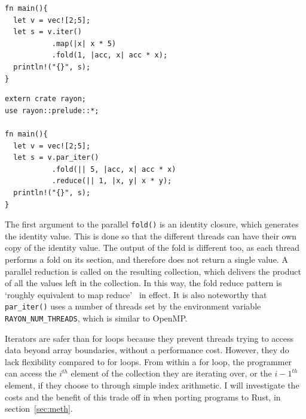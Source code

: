 \noindent\begin{minipage}{.49\textwidth}
\begin{code}
\begin{verbatim}
fn main(){
  let v = vec![2;5];
  let s = v.iter()
           .map(|x| x * 5)
           .fold(1, |acc, x| acc * x);
  println!("{}", s);
}
\end{verbatim}
\label{lst:rust-seq-iter}
\end{code}
\end{minipage}\hfill
\begin{minipage}{.49\textwidth}
\begin{code}
\begin{verbatim}
extern crate rayon;
use rayon::prelude::*;

fn main(){
  let v = vec![2;5];
  let s = v.par_iter()
           .fold(|| 5, |acc, x| acc * x)
           .reduce(|| 1, |x, y| x * y);
  println!("{}", s);
}
\end{verbatim}
\label{lst:rust-par-iter}
\label{lst:iters-a}
\end{code}
\end{minipage}

The first argument to the parallel \texttt{fold()} is an identity closure, which generates the identity value. This is done so that the different threads can have their own copy of the identity value. The output of the fold is different too, as each thread performs a fold on its section, and therefore does not return a single value. A parallel reduction is called on the resulting collection, which delivers the product of all the values left in the collection.
In this way, the fold reduce pattern is `roughly equivalent to map reduce'~\cite{rayonFold} in effect. It is also noteworthy that \texttt{par\_iter()} uses a number of threads set by the environment variable \texttt{RAYON\_NUM\_THREADS}, which is similar to OpenMP\@.

Iterators are safer than for loops because they prevent threads trying to access data beyond array boundaries, without a performance cost. However, they do lack flexibility compared to for loops. From within a for loop, the programmer can access the $i^{th}$ element of the collection they are iterating over, or the $i-1^{th}$ element, if they choose to through simple index arithmetic. I will investigate the costs and the benefit of this trade off in when porting programs to Rust, in section~\ref{sec:meth}.

